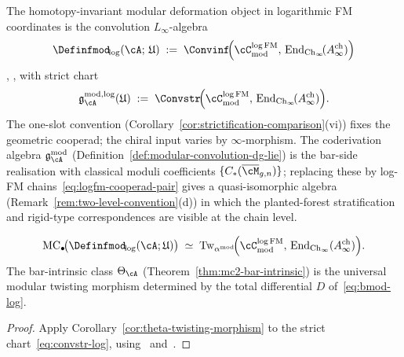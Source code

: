 \begin{construction}
\label{const:vol1-three-preprints-chain-level}
The homotopy-invariant modular deformation object in
logarithmic FM coordinates is the convolution $L_\infty$-algebra
\begin{equation}\label{eq:definfmod-log}
{\Definfmod}_{\!\log}(\cA;\, \mathfrak{U})
\;:=\;
\Convinf\!\Bigl(
\cC^{\log\mathrm{FM}}_{\mathrm{mod}},\,
\operatorname{End}_{\mathrm{Ch}_\infty}\!(A^{\mathrm{ch}}_\infty)
\Bigr)
\end{equation}
\cite[Theorem~5.1]{RNW19}, \cite[Theorem~2.1]{Val16},
with strict chart
\begin{equation}\label{eq:convstr-log}
\mathfrak{g}^{\mathrm{mod},\log}_{\cA}(\mathfrak{U})
\;:=\;
\Convstr\!\Bigl(
\cC^{\log\mathrm{FM}}_{\mathrm{mod}},\,
\operatorname{End}_{\mathrm{Ch}_\infty}\!(A^{\mathrm{ch}}_\infty)
\Bigr).
\end{equation}
The one-slot convention
(Corollary~\ref{cor:strictification-comparison}(vi)) fixes the
geometric cooperad; the chiral input varies by $\infty$-morphism.
The coderivation algebra
$\mathfrak{g}^{\mathrm{mod}}_\cA$
(Definition~\ref{def:modular-convolution-dg-lie}) is the bar-side
realisation with classical moduli coefficients
$\{C_*(\overline{\cM}_{g,n})\}$; replacing these by log-FM
chains~\eqref{eq:logfm-cooperad-pair} gives a quasi-isomorphic
algebra (Remark~\ref{rem:two-level-convention}(d)) in which the
planted-forest stratification and rigid-type correspondences are
visible at the chain level.
\end{construction}

\begin{corollary}
\label{cor:vol1-theta-log-fm-twisting-data}
\[
\operatorname{MC}_\bullet\!\bigl(
{\Definfmod}_{\!\log}(\cA;\mathfrak{U})
\bigr)
\;\simeq\;
\operatorname{Tw}_{\alpha^{\mathrm{mod}}}\!\Bigl(
\cC^{\log\mathrm{FM}}_{\mathrm{mod}},\,
\operatorname{End}_{\mathrm{Ch}_\infty}(A^{\mathrm{ch}}_\infty)
\Bigr).
\]
The bar-intrinsic class $\Theta_\cA$
\textup{(}Theorem~\textup{\ref{thm:mc2-bar-intrinsic})} is the
universal modular twisting morphism determined by the total
differential $D$ of~\eqref{eq:bmod-log}.
\end{corollary}

\begin{proof}
Apply Corollary~\ref{cor:theta-twisting-morphism} to the strict
chart~\eqref{eq:convstr-log}, using~\cite[Theorem~4.1]{RNW19}
and~\cite[Theorem~1.2]{Val16}.
\end{proof}

